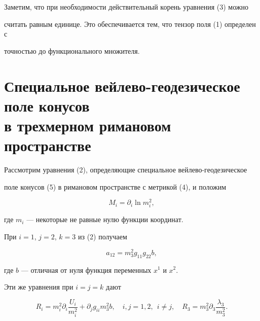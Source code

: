  


Заметим, что при необходимости действительный корень уравнения (3) можно 


считать равным единице. Это обеспечивается тем, что тензор поля (1) определен с 


точностью до функционального множителя. 


 


 


\section{Специальное вейлево-геодезическое поле конусов\protect\\


в трехмерном римановом пространстве} 


 


Рассмотрим уравнения (2), определяющие специальное вейлево-геодезическое 


поле конусов (5) в римановом пространстве с метрикой (4), и положим 


\begin{equation} 


M_i=\partial_i\ln m^2_i, 


\end{equation} 


где $m_i$ --- некоторые не равные нулю функции координат. 


 


При $i=1$, $j=2$, $k=3$ из (2) получаем 


\begin{equation} 


a_{12}=m^2_3g_{11}g_{22}b, 


\end{equation} 


где $b$ --- отличная от нуля функция переменных $x^1$ и $x^2$. 


Эти же уравнения при $i=j=k$ дают 


\begin{equation} 


R_i=m^2_i\partial_i\frac{U_i}{m^2_i}+\partial_j 


g_{ii}m^2_3b,\quad i,j=1,2,\ \ i\ne j,\quad 


R_3=m^2_3\partial_3\frac{\lambda_3}{m^2_3}. 


\end{equation} 


